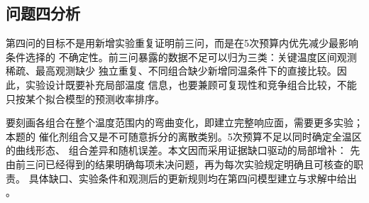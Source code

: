 \subsection{问题四分析}

第四问的目标不是用新增实验重复证明前三问，而是在5次预算内优先减少最影响条件选择的
不确定性。前三问暴露的数据不足可以归为三类：关键温度区间观测稀疏、最高观测缺少
独立重复、不同组合缺少新增同温条件下的直接比较。因此，实验设计既要补充局部温度
信息，也要兼顾可复现性和竞争组合比较，不能只按某个拟合模型的预测收率排序。

要刻画各组合在整个温度范围内的弯曲变化，即建立完整响应面，需要更多实验；本题的
催化剂组合又是不可随意拆分的离散类别。5次预算不足以同时确定全温区的曲线形态、
组合差异和随机误差。本文因而采用证据缺口驱动的局部增补：
先由前三问已经得到的结果明确每项未决问题，再为每次实验规定明确且可核查的职责。
具体缺口、实验条件和观测后的更新规则均在第四问模型建立与求解中给出
\cite{nistreplication,nistrsmcompare}。
